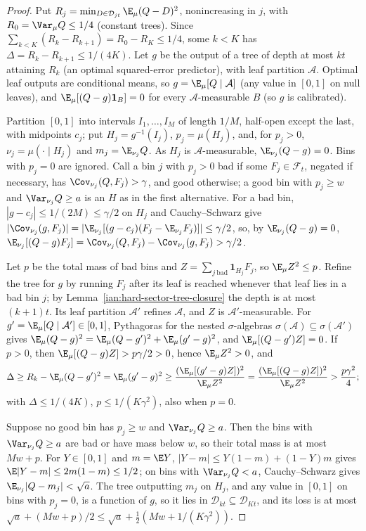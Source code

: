 \begin{proof}
Put \(R_j=\min_{D\in\mathcal D_{jt}}\E_\mu(Q-D)^2\), nonincreasing in \(j\), with \(R_0=\Var_\mu Q\le1/4\) (constant
trees). Since \(\sum_{k<K}(R_k-R_{k+1})=R_0-R_K\le1/4\), some \(k<K\) has \(\Delta=R_k-R_{k+1}\le1/(4K)\). Let \(g\) be the output of a tree of depth at most \(kt\)
attaining \(R_k\) (an optimal squared-error predictor), with leaf partition \(\mathcal A\). Optimal leaf outputs
are conditional means, so \(g=\E_\mu[Q\mid\mathcal A]\) (any value in \([0,1]\) on null leaves), and
\(\E_\mu[(Q-g)\mathbf1_B]=0\) for every \(\mathcal A\)-measurable \(B\) (so \(g\) is calibrated).

Partition \([0,1]\) into intervals \(I_1,\ldots,I_M\) of length \(1/M\), half-open except the last, with
midpoints \(c_j\); put \(H_j=g^{-1}(I_j)\), \(p_j=\mu(H_j)\), and, for \(p_j>0\), \(\nu_j=\mu(\cdot\mid H_j)\)
and \(m_j=\E_{\nu_j}Q\). As \(H_j\) is \(\mathcal A\)-measurable, \(\E_{\nu_j}(Q-g)=0\). Bins with \(p_j=0\) are ignored. Call a bin \(j\) with \(p_j>0\) bad if
some \(F_j\in\mathcal F_t\), negated if necessary, has \(\Cov_{\nu_j}(Q,F_j)>\gamma\), and good otherwise; a
good bin with \(p_j\ge w\) and \(\Var_{\nu_j}Q\ge a\) is an \(H\) as in the first alternative. For a bad bin,
\(|g-c_j|\le1/(2M)\le\gamma/2\) on \(H_j\) and Cauchy--Schwarz give
\(|\Cov_{\nu_j}(g,F_j)|=|\E_{\nu_j}[(g-c_j)(F_j-\E_{\nu_j}F_j)]|\le\gamma/2\), so, by \(\E_{\nu_j}(Q-g)=0\),
\(\E_{\nu_j}[(Q-g)F_j]=\Cov_{\nu_j}(Q,F_j)-\Cov_{\nu_j}(g,F_j)>\gamma/2\).

Let \(p\) be the total mass of bad bins and \(Z=\sum_{j\ \mathrm{bad}}\mathbf1_{H_j}F_j\), so \(\E_\mu Z^2\le
p\). Refine the tree for \(g\) by running \(F_j\) after its leaf is reached whenever that leaf lies in a bad bin
\(j\); by Lemma~\ref{ian:hard-sector-tree-closure} the depth is at most \((k+1)t\). Its leaf partition
\(\mathcal A'\) refines \(\mathcal A\), and \(Z\) is \(\mathcal A'\)-measurable. For \(g'=\E_\mu[Q\mid\mathcal
A']\in[0,1]\), Pythagoras for the nested \(\sigma\)-algebras \(\sigma(\mathcal A)\subseteq\sigma(\mathcal A')\) gives
\(\E_\mu(Q-g)^2=\E_\mu(Q-g')^2+\E_\mu(g'-g)^2\), and \(\E_\mu[(Q-g')Z]=0\). If \(p>0\), then
\(\E_\mu[(Q-g)Z]>p\gamma/2>0\), hence \(\E_\mu Z^2>0\), and
\[
 \Delta\ge R_k-\E_\mu(Q-g')^2=\E_\mu(g'-g)^2\ge\frac{(\E_\mu[(g'-g)Z])^2}{\E_\mu Z^2}
 =\frac{(\E_\mu[(Q-g)Z])^2}{\E_\mu Z^2}>\frac{p\gamma^2}{4};
\]
with \(\Delta\le1/(4K)\), \(p\le1/(K\gamma^2)\), also when \(p=0\).

Suppose no good bin has \(p_j\ge w\) and \(\Var_{\nu_j}Q\ge a\). Then the bins with \(\Var_{\nu_j}Q\ge a\) are
bad or have mass below \(w\), so their total mass is at most \(Mw+p\). For \(Y\in[0,1]\) and \(m=\E Y\),
\(|Y-m|\le Y(1-m)+(1-Y)m\) gives \(\E|Y-m|\le2m(1-m)\le1/2\); on bins with \(\Var_{\nu_j}Q<a\), Cauchy--Schwarz
gives \(\E_{\nu_j}|Q-m_j|<\sqrt a\). The tree outputting \(m_j\) on \(H_j\), and any value in \([0,1]\) on bins
with \(p_j=0\), is a function of \(g\), so it lies in \(\mathcal D_{kt}\subseteq\mathcal D_{Kt}\), and its loss
is at most \(\sqrt a+(Mw+p)/2\le\sqrt a+\frac12(Mw+1/(K\gamma^2))\).
\end{proof}

